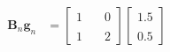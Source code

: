 \documentclass[preview]{standalone}
\begin{document}
\begin{align*}
\begin{align} \mathbf{B}_n \mathbf{g}_n &= \begin{bmatrix} 1 & \quad 0 \\ \\1 & \quad 2 \end{bmatrix}\begin{bmatrix} 1.5 \\ \\ 0.5 \end{bmatrix} \end{align}
\end{align*}
\end{document}
